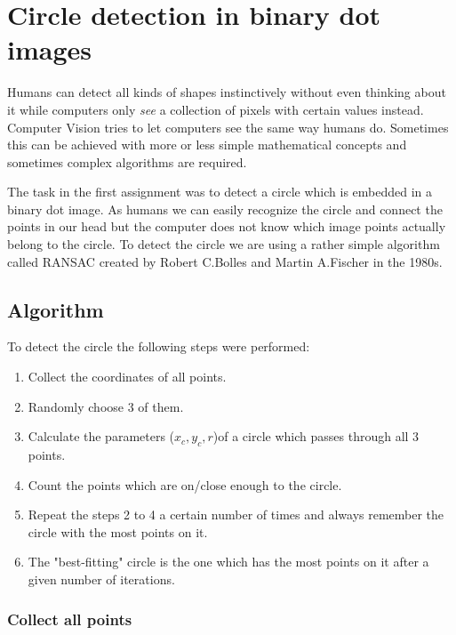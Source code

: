\chapter{Circle detection in binary dot images}
\label{chap:ass01}

Humans can detect all kinds of shapes instinctively without even thinking about it while computers only \textit{see} a collection of pixels with certain values instead. Computer Vision tries to let computers see the same way humans do. Sometimes this can be achieved with more or less simple mathematical concepts and sometimes complex algorithms are required.

The task in the first assignment was to detect a circle which is embedded in a binary dot image. As humans we can easily recognize the circle and connect the points in our head but the computer does not know which image points actually belong to the circle. To detect the circle we are using a rather simple algorithm called RANSAC\cite{Ransac2020} created by Robert C.Bolles and Martin A.Fischer in the 1980s\cite{Fischler1981}.

\section{Algorithm}

To detect the circle the following steps were performed:
\begin{enumerate}
	\item Collect the coordinates of all points.
	\item Randomly choose 3 of them.
	\item Calculate the parameters ($x_c, y_c, r$)of a circle which passes through all 3 points.
	\item Count the points which are  on/close enough to the circle.
	\item Repeat the steps 2 to 4 a certain number of times and always  remember the circle with the most points on it.
	\item The "best-fitting" circle is the one which has the most points on it after a given number of iterations.
\end{enumerate}

\subsection{Collect all points}

